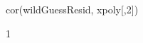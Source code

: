 \begin{Schunk}
\begin{Sinput}
 cor(wildGuessResid, xpoly[,2])
\end{Sinput}
\begin{Soutput}
[1] 1
\end{Soutput}
\end{Schunk}
